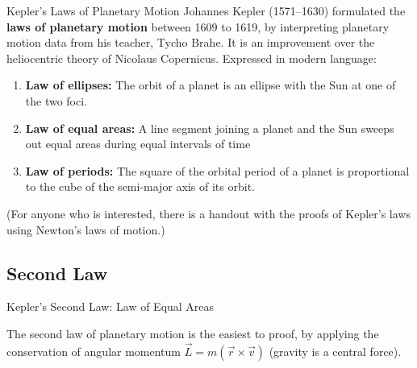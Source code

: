 \documentclass[12pt,compress,aspectratio=169]{beamer}
\begin{document}
\begin{frame}{Kepler's Laws of Planetary Motion}
  Johannes Kepler (1571--1630) formulated the \textbf{laws of planetary motion}
  between 1609 to 1619, by interpreting planetary motion data from his teacher,
  Tycho Brahe. It is an improvement over the heliocentric theory of Nicolaus
  Copernicus. Expressed in modern language:
  \begin{enumerate}
  \item\textbf{Law of ellipses:} The orbit of a planet is an ellipse with the
    Sun at one of the two foci.
  \item\textbf{Law of equal areas:} A line segment joining a planet and the Sun
    sweeps out equal areas during equal intervals of time
  \item \textbf{Law of periods:} The square of the orbital period of a planet
    is proportional to the cube of the semi-major axis of its orbit.
  \end{enumerate}
  (For anyone who is interested, there is a handout with the proofs of Kepler's
  laws using Newton's laws of motion.)
\end{frame}



\subsection{Second Law}

\begin{frame}{Kepler's Second Law: Law of Equal Areas}
  \begin{center}

  \end{center}
  The second law of planetary motion is the easiest to proof, by applying the
  conservation of angular momentum $\vec L=m(\vec r\times\vec v)$ (gravity is a
  central force).
\end{frame}
\end{document}
